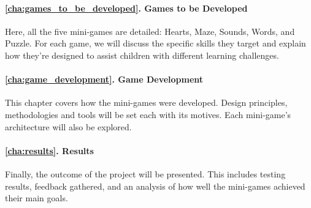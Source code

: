 \paragraph{\ref{cha:games_to_be_developed}. Games to be Developed} Here, all the five mini-games are detailed: Hearts, Maze, Sounds, Words, and Puzzle. For each game, we will discuss the specific skills they target and explain how they’re designed to assist children with different learning challenges.

\paragraph{\ref{cha:game_development}. Game Development} This chapter covers how the mini-games were developed. Design principles, methodologies and tools will be set each with its motives. Each mini-game's architecture will also be explored.

\paragraph{\ref{cha:results}. Results} Finally, the outcome of the project will be presented. This includes testing results, feedback gathered, and an analysis of how well the mini-games achieved their main goals.


\newpage



